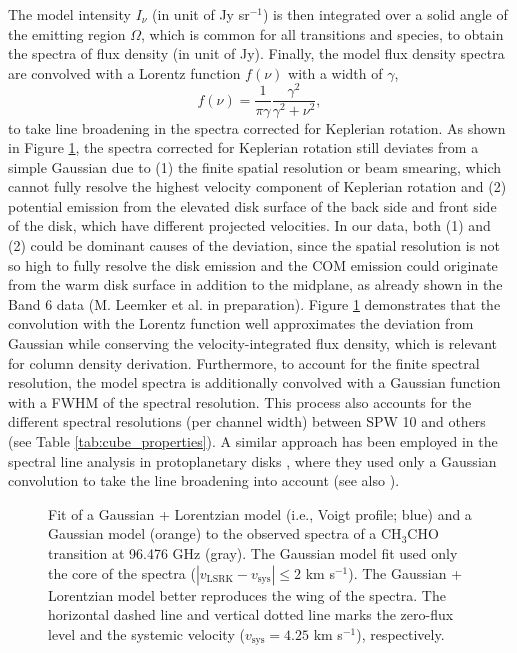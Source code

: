 \documentclass[twocolumn, twocolappendix, astrosymb, times]{aastex631}
\newcommand{\acetaldehyde}{CH$_3$CHO\xspace}
\begin{document}
The model intensity $I_\nu$ (in unit of Jy sr$^{-1}$) is then integrated over a solid angle of the emitting region $\Omega$, which is common for all transitions and species, to obtain the spectra of flux density (in unit of Jy). 
Finally, the model flux density spectra are convolved with a Lorentz function $f(\nu)$ with a width of $\gamma$,
\begin{equation}
    f(\nu) = \frac{1}{\pi\gamma} \frac{\gamma^2}{\gamma^2 + \nu^2},
\end{equation}
to take line broadening in the spectra corrected for Keplerian rotation. As shown in Figure \ref{fig:Lorentzian_demo}, the spectra corrected for Keplerian rotation still deviates from a simple Gaussian due to (1) the finite spatial resolution or beam smearing, which cannot fully resolve the highest velocity component of Keplerian rotation and (2) potential emission from the elevated disk surface of the back side and front side of the disk, which have different projected velocities. In our data, both (1) and (2) could be dominant causes of the deviation, since the spatial resolution is not so high to fully resolve the disk emission and the COM emission could originate from the warm disk surface in addition to the midplane, as already shown in the Band 6 data (M. Leemker et al. in preparation). Figure \ref{fig:Lorentzian_demo} demonstrates that the convolution with the Lorentz function well approximates the deviation from Gaussian while conserving the velocity-integrated flux density, which is relevant for column density derivation. Furthermore, to account for the finite spectral resolution, the model spectra is additionally convolved with a Gaussian function with a FWHM of the spectral resolution. This process also accounts for the different spectral resolutions (per channel width) between SPW 10 and others (see Table \ref{tab:cube_properties}). A similar approach has been employed in the spectral line analysis in protoplanetary disks \citep{Cataldi2021}, where they used only a Gaussian convolution to take the line broadening into account (see also \citealt{Bergner2021, Guzman2021}).




\begin{figure}
\caption{Fit of a Gaussian + Lorentzian model (i.e., Voigt profile; blue) and a Gaussian model (orange) to the observed spectra of a \acetaldehyde transition at 96.476 GHz (gray). The Gaussian model fit used only the core of the spectra ($|v_\mathrm{LSRK} - v_\mathrm{sys}| \leq 2$ km s$^{-1}$). The Gaussian + Lorentzian model better reproduces the wing of the spectra. The horizontal dashed line and vertical dotted line marks the zero-flux level and the systemic velocity ($v_\mathrm{sys} = 4.25$ km s$^{-1}$), respectively.}
\label{fig:Lorentzian_demo}
\end{figure}
\end{document}
